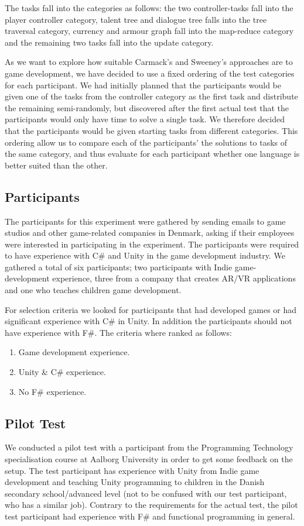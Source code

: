 The tasks fall into the categories as follows: the two controller-tasks fall into the player controller category, talent tree and dialogue tree falls into the tree traversal category, currency and armour graph fall into the map-reduce category and the remaining two tasks fall into the  update category.

As we want to explore how suitable Carmack's and Sweeney's approaches are to game development, we have decided to use a fixed ordering of the test categories for each participant. We had initially planned that the participants would be given one of the tasks from the controller category as the first task and distribute the remaining semi-randomly, but discovered after the first actual test that the participants would only have time to solve a single task. We therefore decided that the participants would be given starting tasks from different categories. This ordering allow us to compare each of the participants' the solutions to tasks of the same category, and thus evaluate for each participant whether one language is better suited than the other.

\subsection{Participants} \label{sec:par-crit}
The participants for this experiment were gathered by sending emails to game studios and other game-related companies in Denmark, asking if their employees were interested in participating in the experiment. The participants were required to have experience with C\# and Unity in the game development industry. We gathered a total of six participants; two participants with Indie game-development experience, three from a company that creates \gls{AR}/\gls{VR} applications and one who teaches children game development.

For selection criteria we looked for participants that had developed games or had significant experience with C\# in Unity. In addition the participants should not have experience with F\#. The criteria where ranked as follows:
\begin{enumerate}
	\item Game development experience.
	\item Unity \& C\# experience.
	\item No F\# experience.
\end{enumerate}

\subsection{Pilot Test}
We conducted a pilot test with a participant from the Programming Technology specialisation course at Aalborg University in order to get some feedback on the setup. The test participant has experience with Unity from Indie game development and teaching Unity programming to children in the Danish secondary school/advanced level (not to be confused with our test participant, who has a similar job). Contrary to the requirements for the actual test, the pilot test participant had experience with F\# and functional programming in general.

